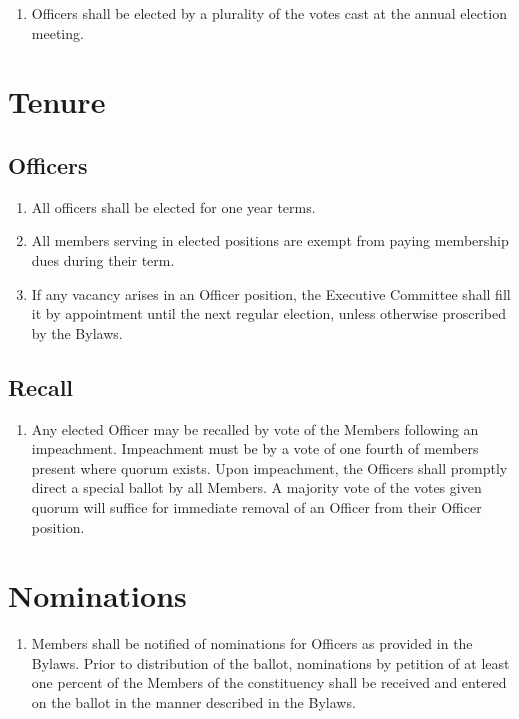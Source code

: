 \documentclass[12pt,letterpaper]{article}
\begin{document}
\begin{enumerate}
	\item Officers shall be elected by a plurality of the votes cast at the annual
				election meeting.
\end{enumerate}

\section{Tenure}

\subsection{Officers}
\begin{enumerate}
	\item All officers shall be elected for one year terms.
	\item All members serving in elected positions are exempt from paying membership
				dues during their term.
	\item If any vacancy arises in an Officer position, the Executive Committee shall
				fill it by appointment until the next regular election, unless otherwise
				proscribed by the Bylaws.
\end{enumerate}

\subsection{Recall}
\begin{enumerate}
	\item Any elected Officer may be recalled by vote of the Members following an
				impeachment. Impeachment must be by a vote of one fourth of members present
				where quorum exists. Upon impeachment, the Officers shall promptly direct a
				special ballot by all Members. A majority vote of the votes given quorum will
				suffice for immediate removal of an Officer from their Officer position.
\end{enumerate}

\section{Nominations}
\begin{enumerate}
	\item Members shall be notified of nominations for Officers as provided in the
				Bylaws. Prior to distribution of the ballot, nominations by petition of at
				least one percent of the Members of the constituency shall be received and
				entered on the ballot in the manner described in the Bylaws.
\end{enumerate}
\end{document}
